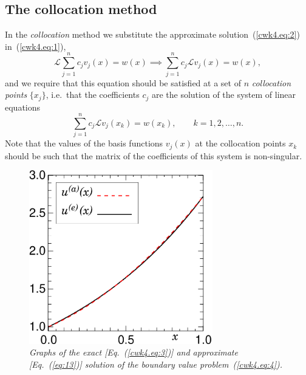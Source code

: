 \subsection{The collocation method}

In the \textit{collocation} method we substitute the approximate
solution~(\ref{cwk4.eq:2}) in~(\ref{cwk4.eq:1}),
%
\begin{equation*}
  \mathcal{L} \sum_{j=1}^n c_j v_j(x) = w(x) \implies
  \sum_{j=1}^n c_j \mathcal{L} v_j(x) = w(x) ,
\end{equation*}
%
and we require that this equation should be satisfied at a set of $n$
\textit{collocation points} $\{x_j\}$, i.e.\ that the coefficients
$c_j$ are the solution of the system of linear equations
%
\begin{equation*}
  \sum_{j=1}^n c_j \mathcal{L} v_j(x_k) = w(x_k) , \qquad k=1,2,\ldots,n.
\end{equation*}
%
Note that the values of the basis functions $v_j(x)$ at the
collocation points $x_k$ should be such that the matrix of the
coefficients of this system is non-singular.

\begin{figure}
  \centerline{\includegraphics[width=80mm]{figures/Collocation}}
  \caption{\label{fig:Collocation} \it Graphs of the exact
    [Eq.~(\ref{cwk4.eq:3})] and approximate [Eq.~(\ref{eq:13})]
    solution of the boundary value problem~(\ref{cwk4.eq:4}).}
\end{figure}

